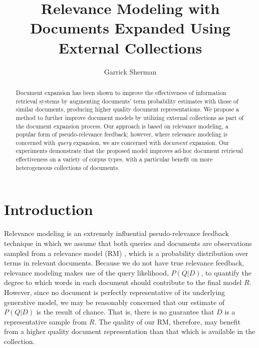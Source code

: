 \documentclass{sig-alternate}
\begin{document}
\author{Garrick Sherman}

\title{Relevance Modeling with Documents Expanded Using External Collections}

\maketitle
\begin{abstract}
Document expansion has been shown to improve the effectiveness of information retrieval systems by augmenting documents' term probability estimates with those of similar documents, producing higher quality document representations. We propose a method to further improve document models by utilizing external collections as part of the document expansion process. Our approach is based on relevance modeling, a popular form of pseudo-relevance feedback; however, where relevance modeling is concerned with \textit{query} expansion, we are concerned with \textit{document} expansion. Our experiments demonstrate that the proposed model improves ad-hoc document retrieval effectiveness on a variety of corpus types, with a particular benefit on more heterogeneous collections of documents.
\end{abstract}

\section{Introduction}\label{section.intro}


Relevance modeling is an extremely influential pseudo-relevance feedback technique in which we assume that both queries and documents are observations sampled from a relevance model (RM) \cite{Lavrenko2001}, which is a probability distribution over terms in relevant documents. Because we do not have true relevance feedback, relevance modeling makes use of the query likelihood, $P(Q|D)$, to quantify the degree to which words in each document should contribute to the final model $R$. However, since no document is perfectly representative of its underlying generative model, we may be reasonably concerned that our estimate of $P(Q|D)$ is the result of chance. That is, there is no guarantee that $D$ is a representative sample from $R$. The quality of our RM, therefore, may benefit from a higher quality document representation than that which is available in the collection.
\end{document}
